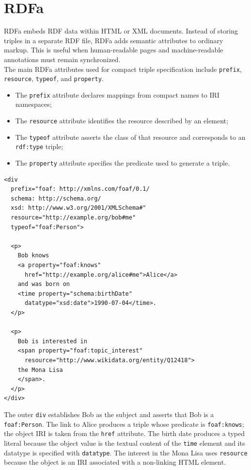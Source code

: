 \documentclass{scrbook}
\begin{document}
	\section{RDFa}
	
	RDFa embeds RDF data within HTML or XML documents. Instead of storing triples in a separate RDF file, RDFa adds semantic attributes to ordinary markup. This is useful when human-readable pages and machine-readable annotations must remain synchronized.\\
	
	The main RDFa attributes used for compact triple specification include \texttt{prefix}, \texttt{resource}, \texttt{typeof}, and \texttt{property}.
	\begin{itemize}
		\item The \texttt{prefix} attribute declares mappings from compact names to IRI namespaces;
		\item The \texttt{resource} attribute identifies the resource described by an element;
		\item The \texttt{typeof} attribute asserts the class of that resource and corresponds to an \texttt{rdf:type} triple;
		\item The \texttt{property} attribute specifies the predicate used to generate a triple.
	\end{itemize}
	
	\begin{lstlisting}
<div
  prefix="foaf: http://xmlns.com/foaf/0.1/
  schema: http://schema.org/
  xsd: http://www.w3.org/2001/XMLSchema#"
  resource="http://example.org/bob#me"
  typeof="foaf:Person">

  <p>
    Bob knows
    <a property="foaf:knows"
      href="http://example.org/alice#me">Alice</a>
    and was born on
    <time property="schema:birthDate"
      datatype="xsd:date">1990-07-04</time>.
  </p>

  <p>
    Bob is interested in
    <span property="foaf:topic_interest"
      resource="http://www.wikidata.org/entity/Q12418">
    the Mona Lisa
    </span>.
  </p>
</div>
	\end{lstlisting}
	
	The outer \texttt{div} establishes Bob as the subject and asserts that Bob is a \texttt{foaf:Person}. The link to Alice produces a triple whose predicate is \texttt{foaf:knows}; the object IRI is taken from the \texttt{href} attribute. The birth date produces a typed literal because the object value is the textual content of the \texttt{time} element and its datatype is specified with \texttt{datatype}. The interest in the Mona Lisa uses \texttt{resource} because the object is an IRI associated with a non-linking HTML element.\\
	
\end{document}
